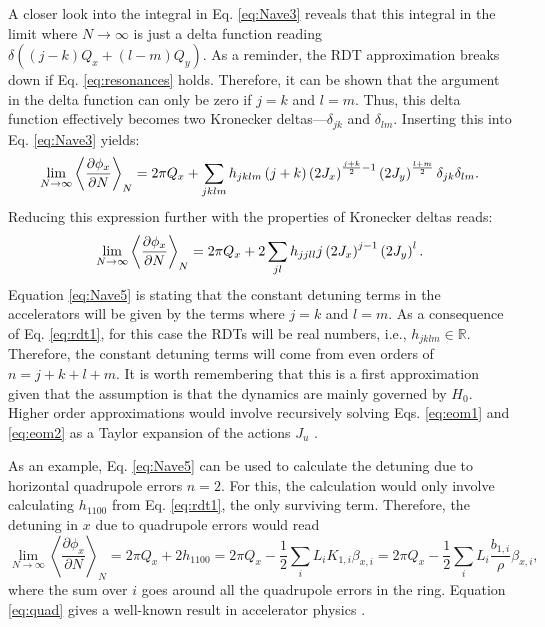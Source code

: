 A closer look into the integral in Eq. \ref{eq:Nave3} reveals that this integral in the limit where $N \rightarrow \infty$ is just a delta function reading $\delta\left( (j-k)Q_x+(l-m)Q_y\right)$. As a reminder, the RDT approximation breaks down if Eq. \ref{eq:resonances} holds. Therefore, it can be shown that the argument in the delta function can only be zero if $j=k$ and $l=m$. Thus, this delta function effectively becomes two Kronecker deltas---$\delta_{jk}$ and $\delta_{lm}$. Inserting this into Eq. \ref{eq:Nave3} yields:
\begin{equation}
    \label{eq:Nave4}
    \lim_{N\to\infty} \left\langle \frac{\partial \phi_x}{\partial N}\right\rangle _N = 2\pi Q_x\\
    +\sum_{jklm} h_{jklm} \left( j+k \right) \left( 2 J_x\right)^{\frac{j+k}{2}-1} \left( 2 J_y\right)^{\frac{l+m}{2}} \delta _{jk} \delta_{lm}.
\end{equation}
Reducing this expression further with the properties of Kronecker deltas reads:
\begin{equation}
    \label{eq:Nave5}
    \lim_{N\to\infty} \left\langle \frac{\partial \phi_x}{\partial N}\right\rangle _N = 2\pi Q_x\\
    +2\sum_{jl} h_{jjll} j \left( 2 J_x\right)^{j-1} \left( 2 J_y\right)^{l}.
\end{equation}
Equation \ref{eq:Nave5} is stating that the constant detuning terms in the accelerators will be given by the terms where $j=k$ and $l=m$. As a consequence of Eq. \ref{eq:rdt1}, for this case the RDTs will be real numbers, i.e., $h_{jklm}\in \mathbb{R}$. Therefore, the constant detuning terms will come from even orders of $n=j+k+l+m$. It is worth remembering that this is a first approximation given that the assumption is that the dynamics are mainly governed by $H_0$. Higher order approximations would involve recursively solving Eqs. \ref{eq:eom1} and \ref{eq:eom2} as a Taylor expansion of the actions $J_u$ \cite{higher}.

As an example, Eq. \ref{eq:Nave5} can be used to calculate the detuning due to horizontal quadrupole errors $n=2$. For this, the calculation would only involve calculating $h_{1100}$ from Eq. \ref{eq:rdt1}, the only surviving term. Therefore, the detuning in $x$ due to quadrupole errors would read  
\begin{equation}
    \label{eq:quad}
    \lim_{N\to\infty} \left\langle \frac{\partial \phi_x}{\partial N}\right\rangle _N = 2\pi Q_x + 2h_{1100} = 2\pi Q_x - \frac{1}{2}\sum_i L_i K_{1,i} \beta_{x,i} = 2\pi Q_x - \frac{1}{2}\sum_i L_i \frac{b_{1,i}}{\rho} \beta_{x,i}, 
\end{equation}
where the sum over $i$ goes around all the quadrupole errors in the ring. Equation \ref{eq:quad} gives a well-known result in accelerator physics \cite{sylee}. 

